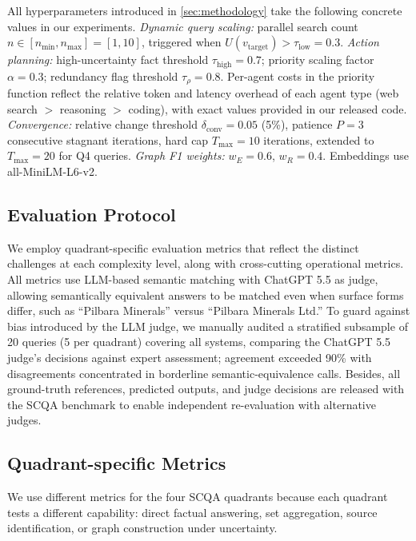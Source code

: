 \documentclass{article}
\begin{document}
All hyperparameters introduced in \autoref{sec:methodology} take the following concrete values in our experiments. \textit{Dynamic query scaling:} parallel search count $n \in [n_{\min}, n_{\max}] = [1, 10]$, triggered when $U(v_{\text{target}}) > \tau_{\text{low}} = 0.3$. \textit{Action planning:} high-uncertainty fact threshold $\tau_{\text{high}} = 0.7$; priority scaling factor $\alpha = 0.3$; redundancy flag threshold $\tau_{\rho} = 0.8$. Per-agent costs in the priority function reflect the relative token and latency overhead of each agent type (web search $>$ reasoning $>$ coding), with exact values provided in our released code. \textit{Convergence:} relative change threshold $\delta_{\text{conv}} = 0.05$ (5\%), patience $P = 3$ consecutive stagnant iterations, hard cap $T_{\max} = 10$ iterations, extended to $T_{\max} = 20$ for Q4 queries. \textit{Graph F1 weights:} $w_E = 0.6$, $w_R = 0.4$. Embeddings use all-MiniLM-L6-v2.

\subsection{Evaluation Protocol}
\label{subsec:evaluation-metrics}

We employ quadrant-specific evaluation metrics that reflect the distinct challenges at each complexity level, along with cross-cutting operational metrics. All metrics use LLM-based semantic matching with ChatGPT 5.5 as judge, allowing semantically equivalent answers to be matched even when surface forms differ, such as ``Pilbara Minerals'' versus ``Pilbara Minerals Ltd.'' 
To guard against bias introduced by the LLM judge, we manually audited a stratified subsample of 20 queries (5 per quadrant) covering all systems, comparing the ChatGPT 5.5 judge's decisions against expert assessment; agreement exceeded 90\% with disagreements concentrated in borderline semantic-equivalence calls. Besides, all ground-truth references, predicted outputs, and judge decisions are released with the SCQA benchmark to enable independent re-evaluation with alternative judges.

\subsection{Quadrant-specific Metrics}
\label{subsec:quadrant-metrics}

We use different metrics for the four SCQA quadrants because each quadrant tests a different capability: direct factual answering, set aggregation, source identification, or graph construction under uncertainty.
\end{document}
